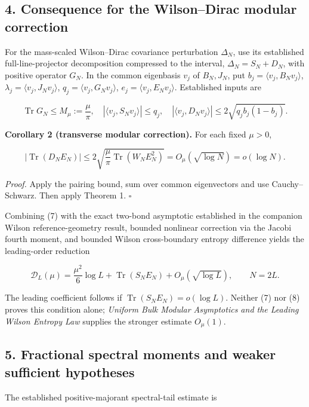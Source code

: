 \documentclass[
  10pt,
  a4paper,
]{article}
\begin{document}
\subsection{4. Consequence for the Wilson--Dirac modular correction}\label{consequence-for-the-wilsondirac-modular-correction}

For the mass-scaled Wilson--Dirac covariance perturbation \(\Delta_N\), use its established full-line-projector decomposition compressed to the interval, \(\Delta_N=S_N+D_N\), with positive operator \(G_N\). In the common eigenbasis \(v_j\) of \(B_N,J_N\), put \(b_j=\langle v_j,B_Nv_j\rangle\), \(\lambda_j=\langle v_j,J_Nv_j\rangle\), \(q_j=\langle v_j,G_Nv_j\rangle\), \(e_j=\langle v_j,E_Nv_j\rangle\). Established inputs are

\[
\operatorname{Tr}G_N\le M_\mu:=\frac\mu\pi,
\quad |\langle v_j,S_Nv_j\rangle|\le q_j,
\quad |\langle v_j,D_Nv_j\rangle|\le2\sqrt{q_jb_j(1-b_j)}.
\]

\textbf{Corollary 2 (transverse modular correction).} For each fixed \(\mu>0\),

\[
\boxed{\left|\operatorname{Tr}(D_NE_N)\right|
\le2\sqrt{\frac\mu\pi\operatorname{Tr}(W_NE_N^2)}
=O_\mu(\sqrt{\log N})=o(\log N).}
\tag{7}
\]

\emph{Proof.} Apply the pairing bound, sum over common eigenvectors and use Cauchy--Schwarz. Then apply Theorem 1. \(\square\)

Combining (7) with the exact two-bond asymptotic established in the companion Wilson reference-geometry result, bounded nonlinear correction via the Jacobi fourth moment, and bounded Wilson cross-boundary entropy difference yields the leading-order reduction

\[
\boxed{\mathcal D_L(\mu)=\frac{\mu^2}{6}\log L
+\operatorname{Tr}(S_NE_N)+O_\mu(\sqrt{\log L}),\qquad N=2L.}
\tag{8}
\]

The leading coefficient follows if \(\operatorname{Tr}(S_NE_N)=o(\log L)\). Neither (7) nor (8) proves this condition alone; \emph{Uniform Bulk Modular Asymptotics and the Leading Wilson Entropy Law} supplies the stronger estimate \(O_\mu(1)\).

\subsection{5. Fractional spectral moments and weaker sufficient hypotheses}\label{fractional-spectral-moments-and-weaker-sufficient-hypotheses}

The established positive-majorant spectral-tail estimate is
\end{document}
